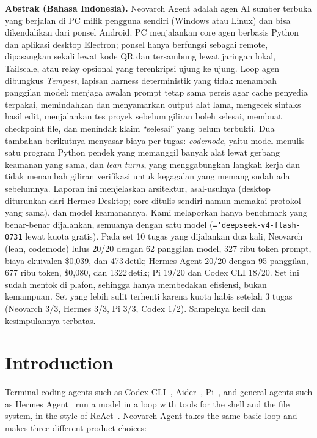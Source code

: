 \documentclass[11pt]{article}
\newcommand{\code}[1]{\texttt{\hyphenchar\font=`\-\relax #1}}
\begin{document}
\begin{center}
\begin{minipage}{0.92\linewidth}
\small
\textbf{Abstrak (Bahasa Indonesia).}
Neovarch Agent adalah agen AI sumber terbuka yang berjalan di PC milik pengguna sendiri (Windows atau Linux) dan bisa
dikendalikan dari ponsel Android. PC menjalankan core agen berbasis Python dan aplikasi desktop Electron; ponsel hanya
berfungsi sebagai remote, dipasangkan sekali lewat kode QR dan tersambung lewat jaringan lokal, Tailscale, atau relay
opsional yang terenkripsi ujung ke ujung. Loop agen dibungkus \emph{Tempest}, lapisan harness deterministik yang tidak menambah panggilan model:
menjaga awalan prompt tetap sama persis agar cache penyedia terpakai, memindahkan dan menyamarkan output alat lama,
mengecek sintaks hasil edit, menjalankan tes proyek sebelum giliran boleh selesai, membuat checkpoint file, dan menindak klaim
``selesai'' yang belum terbukti. Dua tambahan berikutnya menyasar biaya per tugas: \emph{codemode}, yaitu model menulis satu
program Python pendek yang memanggil banyak alat lewat gerbang keamanan yang sama, dan \emph{lean turns}, yang menggabungkan
langkah kerja dan tidak menambah giliran verifikasi untuk kegagalan yang memang sudah ada sebelumnya. Laporan ini menjelaskan arsitektur,
asal-usulnya (desktop diturunkan dari Hermes Desktop; core ditulis sendiri namun memakai protokol yang sama), dan model keamanannya.
Kami melaporkan hanya benchmark yang benar-benar dijalankan, semuanya dengan satu model (\code{deepseek-v4-flash-0731} lewat kuota
gratis). Pada set 10 tugas yang dijalankan dua kali, Neovarch (lean, codemode) lulus 20/20 dengan 62 panggilan model,
327 ribu token prompt, biaya ekuivalen \$0,039, dan 473\,detik; Hermes Agent 20/20 dengan 95 panggilan, 677 ribu token, \$0,080,
dan 1322\,detik; Pi 19/20 dan Codex CLI 18/20. Set ini sudah mentok di plafon, sehingga hanya membedakan efisiensi, bukan kemampuan.
Set yang lebih sulit terhenti karena kuota habis setelah 3 tugas (Neovarch 3/3, Hermes 3/3, Pi 3/3, Codex 1/2).
Sampelnya kecil dan kesimpulannya terbatas.
\end{minipage}
\end{center}

\section{Introduction}

Terminal coding agents such as Codex CLI~\citep{codexcli}, Aider~\citep{aider}, Pi~\citep{pi}, and general agents such as
Hermes Agent~\citep{hermesagent} run a model in a loop with tools for the shell and the file system, in the style of
ReAct~\citep{yao2023react}. Neovarch Agent takes the same basic loop and makes three different product choices:
\end{document}
